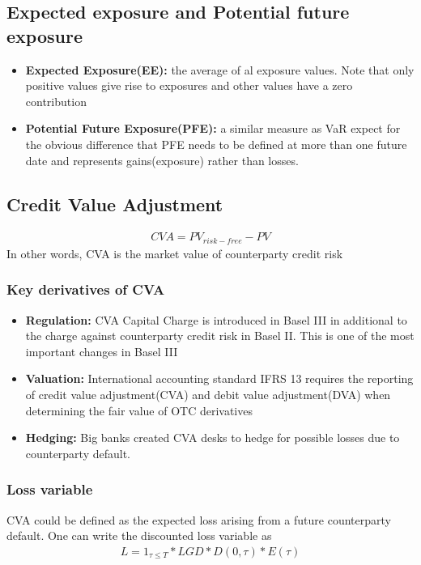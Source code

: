 \documentclass{article}
\theoremstyle{definition}
\theoremstyle{thrm}
\theoremstyle{lma}
\theoremstyle{ppst}
\theoremstyle{crlr}
\begin{document}
\subsection{Expected exposure and Potential future exposure}
\begin{itemize}
	\item \textbf{Expected Exposure(EE): } the average of al exposure values. Note that only positive values give rise to exposures and other values have a zero contribution
	\item \textbf{Potential Future Exposure(PFE): } a similar measure as VaR expect for the obvious difference that PFE needs to be defined at more than one future date and represents gains(exposure) rather than losses. 
\end{itemize}

\subsection{Credit Value Adjustment}
\begin{align*}
	CVA = PV_{risk-free} - PV
\end{align*}
In other words, CVA is the market value of counterparty credit risk

\subsubsection{Key derivatives of CVA}
\begin{itemize}
	\item \textbf{Regulation: } CVA Capital Charge is introduced in Basel III in additional to the charge against counterparty credit risk in Basel II. This is one of the most important changes in Basel III
	\item \textbf{Valuation: } International accounting standard IFRS 13 requires the reporting of credit value adjustment(CVA) and debit value adjustment(DVA) when determining the fair value of OTC derivatives
	\item \textbf{Hedging: }Big banks created CVA desks to hedge for possible losses due to counterparty default. 
\end{itemize}
\subsubsection{Loss variable}
CVA could be defined as the expected loss arising from a future counterparty default. One can write the discounted loss variable as 
\begin{align*}
	L = 1_{\tau \leq T} * LGD * D(0,\tau)*E(\tau)
\end{align*}
\end{document}
